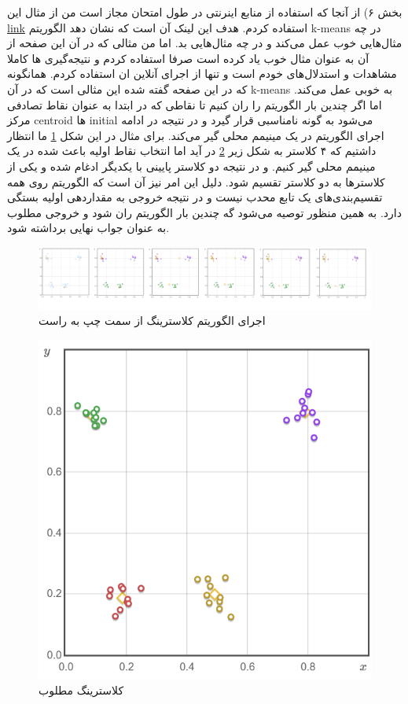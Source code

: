 \begin{sol}
بخش ۶)
از آنجا که استفاده از منابع اینرنتی در طول امتحان مجاز است من از مثال این 
\href{http://www.onmyphd.com/print.php?p=k-means.clustering}{link}
استفاده کردم.
هدف این لینک آن است که نشان دهد الگوریتم k-means در چه مثال‌هایی خوب عمل ‌می‌کند و در چه مثال‌هایی بد. 
اما من مثالی که در آن این صفحه از آن به عنوان مثال خوب یاد کرده است صرفا استفاده کردم و نتیجه‌گیری ها کاملا مشاهدات و استدلال‌های خودم است و تنها از اجرای آنلاین ان استفاده کردم.
همانگونه که در این صفحه گفته شده این مثالی است که در آن k-means به خوبی عمل می‌کند. اما اگر چندین بار الگوریتم را ران کنیم تا نقاطی که در ابتدا به عنوان نقاط تصادفی مرکز centroid ها initial می‌شود به گونه نامناسبی قرار گیرد و در نتیجه در ادامه اجرای الگوریتم در یک مینیمم محلی گیر می‌کند.
برای مثال در این شکل \ref{fig: 1} ما انتظار داشتیم که ۴ کلاستر به شکل زیر \ref{fig: 2} در آید اما انتخاب نقاط اولیه باعث شده در یک مینیمم محلی گیر کنیم.
و در نتیجه دو کلاستر پایینی با یکدیگر ادغام شده و یکی از کلاسترها به دو کلاستر تقسیم شود.
دلیل این امر نیز آن است که الگوریتم روی همه تقسیم‌بندی‌های یک تابع محدب نیست و در نتیجه خروجی به مقداردهی اولیه بستگی دارد. به همین منظور توصیه می‌شود گه چندین بار الگوریتم ران شود و خروجی مطلوب به عنوان جواب نهایی برداشته شود. 

\begin{figure}[h]
\centering
\includegraphics[scale=0.25]{1.png}
\caption{اجرای الگوریتم کلاسترینگ از سمت چپ به راست}
\label{fig: 1}
\end{figure}

\begin{figure}[h]
\centering
\includegraphics[scale=0.25]{2.PNG}
\caption{کلاسترینگ مطلوب}
\label{fig: 2}
\end{figure}


\end{sol}


